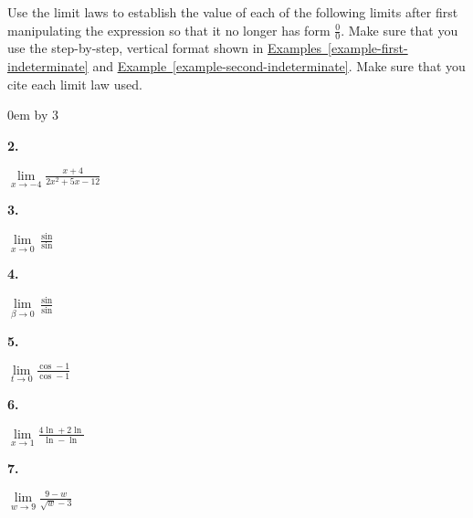 \documentclass[12pt,]{book}
\theoremstyle{plain}
\theoremstyle{definition}
\numberwithin{equation}{section}
\newenvironment{exercisegroup}%
{\medskip\noindent}%
{\par\bigskip}%
\newlength{\exercisegroupindent}%
\newlength{\exercisegroupitemwidth}%
\newenvironment{exercisegrouplist}%
{\vspace{-\partopsep}%
\begin{adjustwidth}{\exercisegroupindent}{0em}}%
{\end{adjustwidth}%
\vspace{-\partopsep}%
\vspace{\baselineskip}}%
\newenvironment{exercisegroupbyrow}[1]%
{\begin{exercisegrouplist}%
\setlength{\parindent}{0em}%
\setlength{\exercisegroupitemwidth}{\linewidth}%
\addtolength{\exercisegroupitemwidth}{\columnsep}%
\divide\exercisegroupitemwidth by #1%
\addtolength{\exercisegroupitemwidth}{-\columnsep}}%
{\end{exercisegrouplist}}%
\newenvironment{exercisegroupitem}[1]%
{\begin{minipage}[t]{\exercisegroupitemwidth}
\vspace{0pt}%
{\bfseries#1}%
\rule{0pt}{\baselineskip}}{\strut%
\end{minipage}%
\hspace{\columnsep}}%
\providecommand\phantomsection{}
\newcommand{\fe}[2]{\mathop{{#1}{\left(#2\right)}}}
\begin{document}
\begin{exercisegroup}%
Use the limit laws to establish the value of each of the following limits after first manipulating the expression so that it
no longer has form \(\frac{0}{0}\). Make sure that you use the step-by-step, vertical format shown in \hyperref[example-first-indeterminate]{Examples~\ref*{example-first-indeterminate}} and \hyperref[example-second-indeterminate]{Example~\ref*{example-second-indeterminate}}. Make sure that you cite each limit law used.%
\begin{exercisegroupbyrow}{3}%
\begin{exercisegroupitem}{2. }\phantomsection\hypertarget{exercise-57}{\null}
\(\lim\limits_{x\to-4}\frac{x+4}{2x^2+5x-12}\)%
\end{exercisegroupitem}%
\begin{exercisegroupitem}{3. }\phantomsection\hypertarget{exercise-58}{\null}
\(\lim\limits_{x\to0}\frac{\fe{\sin}{2x}}{\fe{\sin}{x}}\)%
\end{exercisegroupitem}%
\begin{exercisegroupitem}{4. }\phantomsection\hypertarget{exercise-59}{\null}
\(\lim\limits_{\beta\to0}\frac{\fe{\sin}{\beta+\pi}}{\fe{\sin}{\beta}}\)%
\end{exercisegroupitem}%
\par%
\begin{exercisegroupitem}{5. }\phantomsection\hypertarget{exercise-60}{\null}
\(\lim\limits_{t\to0}\frac{\fe{\cos}{2t}-1}{\fe{\cos}{t}-1}\)%
\end{exercisegroupitem}%
\begin{exercisegroupitem}{6. }\phantomsection\hypertarget{exercise-61}{\null}
\(\lim\limits_{x\to1}\frac{4\fe{\ln}{x}+2\fe{\ln}{x^3}}{\fe{\ln}{x}-\fe{\ln}{\sqrt{x}}}\)%
\end{exercisegroupitem}%
\begin{exercisegroupitem}{7. }\phantomsection\hypertarget{exercise-62}{\null}
\(\lim\limits_{w\to9}\frac{9-w}{\sqrt{w}-3}\)%
\end{exercisegroupitem}%
\par%
\end{exercisegroupbyrow}%
\end{exercisegroup}%
\typeout{************************************************}
\typeout{************************************************}
\end{document}
